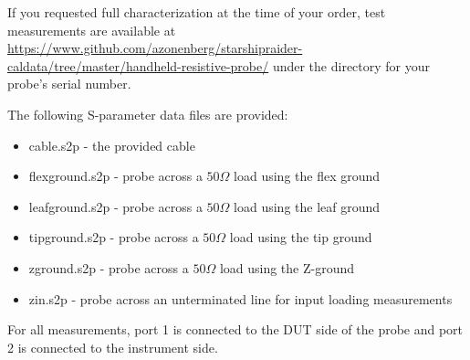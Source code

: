 \documentclass[11pt]{article}
\begin{document}
If you requested full characterization at the time of your order, test measurements are available at
\url{https://www.github.com/azonenberg/starshipraider-caldata/tree/master/handheld-resistive-probe/} under the
directory for your probe's serial number.

The following S-parameter data files are provided:
\begin{itemize}
\item cable.s2p - the provided cable
\item flexground.s2p - probe across a $50 \Omega$ load using the flex ground
\item leafground.s2p - probe across a $50 \Omega$ load using the leaf ground
\item tipground.s2p - probe across a $50 \Omega$ load using the tip ground
\item zground.s2p - probe across a $50 \Omega$ load using the Z-ground
\item zin.s2p - probe across an unterminated line for input loading measurements
\end{itemize}

For all measurements, port 1 is connected to the DUT side of the probe and port 2 is connected to the instrument side.
\end{document}

